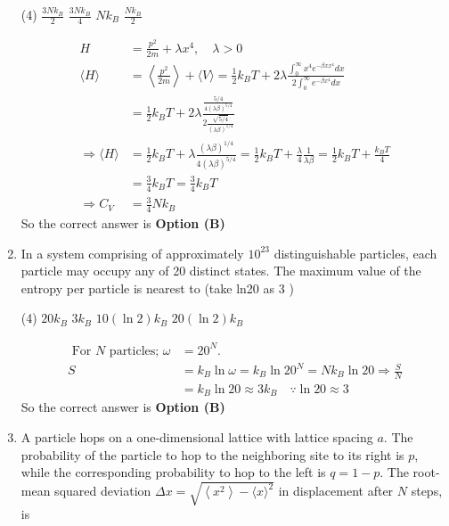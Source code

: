 \begin{enumerate}
\begin{tasks}(4)
\task[\textbf{A.}] $\frac{3 N k_{B}}{2}$
\task[\textbf{B.}] $\frac{3 N k_{B}}{4}$
\task[\textbf{C.}] $N k_{B}$
\task[\textbf{D.}] $\frac{N k_{B}}{2}$
\end{tasks}
\begin{answer}
\begin{align*}
H&=\frac{p^{2}}{2 m}+\lambda x^{4}, \quad \lambda>0\\
\langle H\rangle&=\left\langle\frac{p^{2}}{2 m}\right\rangle+\langle V\rangle=\frac{1}{2} k_{B} T+2 \lambda \frac{\int_{0}^{\infty} x^{4} e^{-\beta x x^{4}} d x}{2 \int_{0}^{\infty} e^{-\beta x^{4}} d x}\\&=\frac{1}{2} k_{B} T+2 \lambda \frac{\frac{5 / 4}{4(\lambda \beta)^{5 / 4}}}{2 \frac{\sqrt{5 / 4}}{(\lambda \beta)^{1 / 4}}}\\
\Rightarrow\langle H\rangle&=\frac{1}{2} k_{B} T+\lambda \frac{(\lambda \beta)^{1 / 4}}{4(\lambda \beta)^{5 / 4}}=\frac{1}{2} k_{B} T+\frac{\lambda}{4} \frac{1}{\lambda \beta}=\frac{1}{2} k_{B} T+\frac{k_{B} T}{4}\\&=\frac{3}{4} k_{B} T=\frac{3}{4} k_{B} T\\
\Rightarrow C_{V}&=\frac{3}{4} N k_{B}
\end{align*}
So the correct answer is \textbf{Option (B)}
\end{answer}
	\item In a system comprising of approximately $10^{23}$ distinguishable particles, each particle may occupy any of 20 distinct states. The maximum value of the entropy per particle is nearest to (take ln20 as 3 )
\begin{tasks}(4)
\task[\textbf{A.}] $20 k_{B}$
\task[\textbf{B.}]  $3 k_{B}$
\task[\textbf{C.}] $10(\ln 2) k_{B}$
\task[\textbf{D.}] $20(\ln 2) k_{B}$
\end{tasks}
\begin{answer}
\begin{align*}
\text{	For $N$ particles; }\omega&=20^{N} .\\
S&=k_{B} \ln \omega=k_{B} \ln 20^{N}=N k_{B} \ln 20 \Rightarrow \frac{S}{N}\\&=k_{B} \ln 20 \approx 3 k_{B} \quad \because \ln 20 \approx 3
\end{align*}
So the correct answer is \textbf{Option (B)}
\end{answer}
	\item A particle hops on a one-dimensional lattice with lattice spacing $a$. The probability of the particle to hop to the neighboring site to its right is $p$, while the corresponding probability to hop to the left is $q=1-p$. The root-mean squared deviation $\Delta x=\sqrt{\left\langle x^{2}\right\rangle-\langle x\rangle^{2}}$ in displacement after $N$ steps, is

\end{enumerate}
